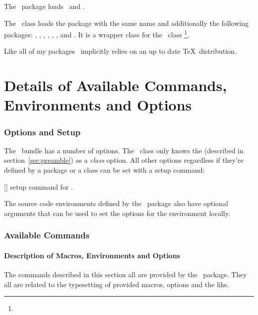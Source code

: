 \documentclass[load-preamble]{cnltx-doc}
\begin{document}
The \cnltxtools\ package loads \cnltxbase\ and
.

The \cnltxdoc\ class loads the package with the same name and additionally
the following packages: \cnltxbase, \cnltxexample, ,
, ,
,  and
.  It is a wrapper class for the
\KOMAScript\ class \footnote{}.

Like all of my packages \cnltx\ implicitly relies on an up to date \TeX\
distribution.

\part{Details of Available Commands, Environments and Options}

\section{Options and Setup}
The \cnltx\ bundle has a number of options.  The \cnltxdoc\ class only knows
the \option{load-preamble} (described in section~\ref{sec:preamble}) as a
\emph{class} option.  All other options regardless if they're defined by a
package or a class can be set with a setup command:
\begin{commands}
  []
    setup command for \cnltx.
\end{commands}
The source code environments defined by the \cnltxexample\ package also have
optional arguments that can be used to set the options for the environment
locally.

\section{Available Commands}
\subsection{Description of Macros, Environments and  Options}\label{sec:cmds:macros}

The commands described in this section all are provided by the \cnltx\
package.  They all are related to the typesetting of
provided macros, options and the like.
\end{document}
